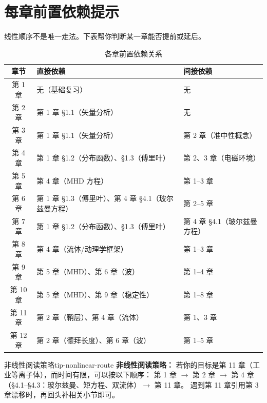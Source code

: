 \documentclass[12pt,a4paper,openany,oneside]{book}
\begin{document}
\section*{每章前置依赖提示}
{}

线性顺序不是唯一走法。下表帮你判断某一章能否提前或延后。

\begin{table}[htbp]
\centering
\caption{各章前置依赖关系}
\small
\begin{tabular}{@{}cp{6.4cm}p{4.6cm}@{}}
\toprule
\textbf{章节} & \textbf{直接依赖} & \textbf{间接依赖} \\
\midrule
第 1 章 & 无（基础复习） & 无 \\
第 2 章 & 第 1 章 \S 1.1（矢量分析） & 无 \\
第 3 章 & 第 1 章 \S 1.1（矢量分析） & 第 2 章（准中性概念） \\
第 4 章 & 第 1 章 \S 1.2（分布函数）、\S 1.3（傅里叶） & 第 2、3 章（电磁环境） \\
第 5 章 & 第 4 章（MHD 方程） & 第 1--3 章 \\
第 6 章 & 第 1 章 \S 1.3（傅里叶）、第 4 章 \S 4.1（玻尔兹曼方程） & 第 2--5 章 \\
第 7 章 & 第 1 章 \S 1.2（分布函数）、\S 1.3（傅里叶） & 第 4 章 \S 4.1（玻尔兹曼方程） \\
第 8 章 & 第 4 章（流体/动理学框架） & 第 1--3 章 \\
第 9 章 & 第 5 章（MHD）、第 6 章（波） & 第 1--4 章 \\
第 10 章 & 第 5 章（MHD）、第 9 章（稳定性） & 第 1--8 章 \\
第 11 章 & 第 2 章（鞘层）、第 4 章（流体） & 第 1、3 章 \\
第 12 章 & 第 2 章（德拜长度）、第 6 章（波） & 第 1--5 章 \\
\bottomrule
\end{tabular}
\end{table}

\begin{tip}{非线性阅读策略}{tip-nonlinear-route}
\textbf{非线性阅读策略：}
若你的目标是第 11 章（工业等离子体），而时间有限，可以按以下顺序：
第 1 章 $\to$ 第 2 章 $\to$ 第 4 章（\S 4.1--\S 4.3：玻尔兹曼、矩方程、双流体）$\to$ 第 11 章。
遇到第 11 章引用第 3 章漂移时，再回头补相关小节即可。
\end{tip}


\end{document}
